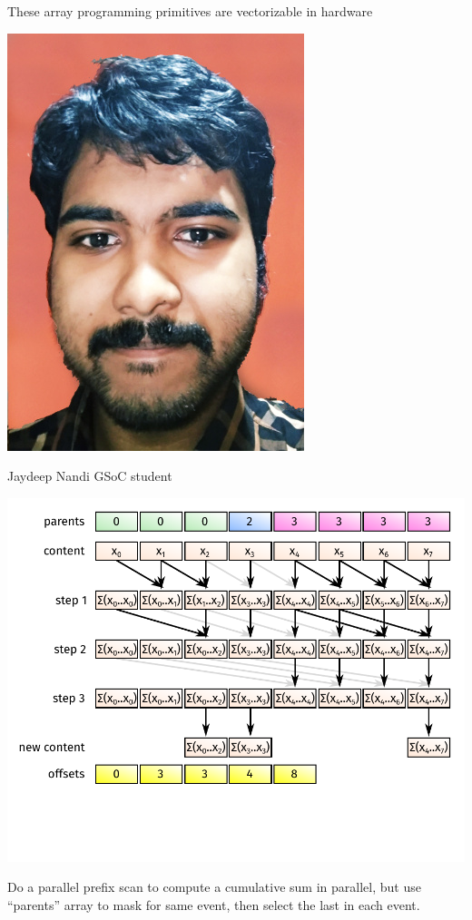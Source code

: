 \documentclass[aspectratio=169]{beamer}
\begin{document}
\begin{frame}{These array programming primitives are vectorizable in hardware}
\vspace{0.25 cm}
\hfill \begin{minipage}{0.2\linewidth}
\begin{center}
\includegraphics[height=2.5 cm]{jaydeep.jpg}

\small Jaydeep Nandi GSoC student
\end{center}
\end{minipage}

\vspace{-3.55 cm}
\includegraphics[width=0.75\linewidth]{hillis-steele-3.pdf}

\vspace{-1.5 cm} Do a parallel prefix scan to compute a cumulative sum in parallel, but use ``parents'' array to mask for same event, then select the last in each event. \vspace{1.5 cm}
\end{frame}
\end{document}

